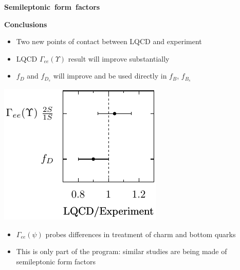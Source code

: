 \documentclass[landscape]{article}
\newenvironment{slide}[1][ ]{\mbox{\bf \boldmath #1 } \vfill}{\vfill \vspace{-1.5 cm} \mbox{ } \pagebreak}
\newenvironment{itemizer}[1]{\begin{itemize}\setlength{\itemsep}{#1}}{\end{itemize}}
\begin{document}
\begin{slide}[Semileptonic form factors]
\end{slide}

\begin{slide}[Conclusions]

\begin{minipage}{0.55\linewidth}
  \begin{itemizer}{0.75 cm}

    \item Two new points of contact between LQCD and experiment

    \item LQCD $\Gamma_{ee}(\Upsilon)$ result will improve substantially

    \item $f_D$ and $f_{D_s}$ will improve and be used directly in $f_B$, $f_{B_s}$

  \end{itemizer}
\end{minipage} \hfill \begin{minipage}{0.4\linewidth}
  \includegraphics[width=\linewidth]{new_ratio_plot2}
\end{minipage}

\vspace{0.5 cm}

\begin{itemizer}{0.75 cm}

  \item $\Gamma_{ee}(\psi)$ probes differences in treatment of charm and bottom quarks

  \item This is only part of the program: similar studies are being
  made of semileptonic form factors

\end{itemizer}

\end{slide}
\end{document}
